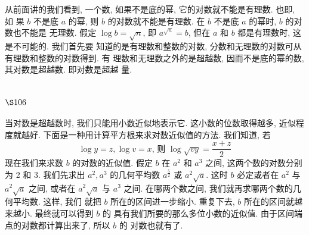 从前面讲的我们看到, 一个数, 如果不是底的幂, 它的对数就不能是有理数. 也即, 如 果 $b$ 不是底 $a$ 的幂, 则 $b$ 的对数就不能是有理数. 在 $b$ 不是底 $a$ 的幂时, $b$ 的对数也不能是 无理数. 假定 $\log b=\sqrt{n}$, 即 $a^{\sqrt{n}}=b$, 但在 $a$ 和 $b$ 都是有理数时, 这是不可能的. 我们首先要 知道的是有理数和整数的对数, 分数和无理数的对数可从有理数和整数的对数得到. 有 理数和无理数之外的是超越数, 因而不是底的幂的数, 其对数是超越数. 即对数是超越 量.

\section{$\S 106$}

当对数是超越数时, 我们只能用小数近似地表示它. 这小数的位数取得越多, 近似程 度就越好. 下面是一种用计算平方根来求对数近似值的方法. 我们知道, 若
\[
\log y=z, \log v=x \text {, 则 } \log \sqrt{v y}=\frac{x+z}{2}
\]
现在我们来求数 $b$ 的对数的近似值. 假定 $b$ 在 $a^{2}$ 和 $a^{3}$ 之间, 这两个数的对数分别为 2 和 3. 我们先求出 $a^{2}, a^{3}$ 的几何平均数 $a^{\frac{5}{2}}$ 或 $a^{2} \sqrt{a}$. 这时 $b$ 必定或者在 $a^{2}$ 与 $a^{2} \sqrt{a}$ 之间, 或者在 $a^{2} \sqrt{a}$ 与 $a^{3}$ 之间. 在哪两个数之间, 我们就再求哪两个数的几何平均数. 这样, 我们 就把 $b$ 所在的区间进一步缩小. 重复下去, $b$ 所在的区间就越来越小. 最终就可以得到 $b$ 的 具有我们所要的那么多位小数的近似值. 由于区间端点的对数都计算出来了, 所以 $b$ 的 对数也就有了.

